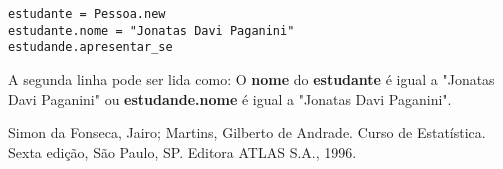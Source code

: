 \documentclass[espaco=simples,appendix=Name]{abnt}
\newcommand{\code}[1] {\textbf{#1}}
\begin{document}
\begin{lstlisting}[caption=Usando uma classe com métodos e atributos de acesso]
estudante = Pessoa.new
estudante.nome = "Jonatas Davi Paganini"
estudande.apresentar_se
\end{lstlisting}

A segunda linha pode ser lida como: O \code{nome} do \code{estudante} é igual a "Jonatas Davi Paganini" ou \code{estudande.nome} é igual a "Jonatas Davi Paganini".



\begin{thebibliography}{9}

Simon da Fonseca, Jairo; Martins, Gilberto de Andrade.
Curso de Estatística.
Sexta edição, São Paulo, SP. Editora ATLAS S.A., 1996.
\end{thebibliography} 
\end{document}
